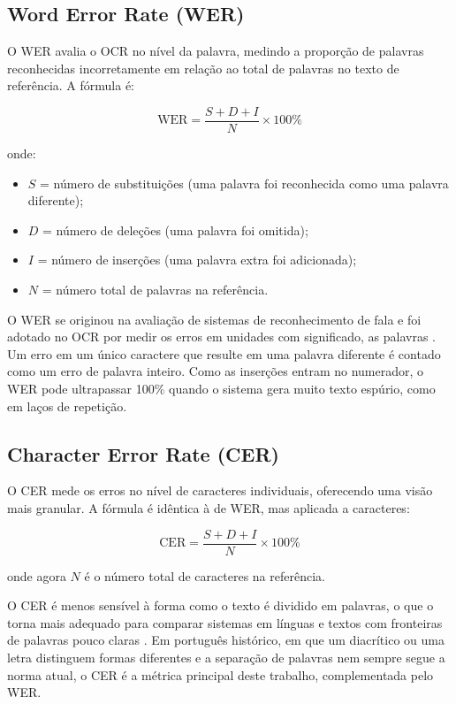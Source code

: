 \documentclass[noabntexcite,oneside]{ufsc-thesis-rn46-2019}
\begin{document}
\subsection{Word Error Rate (WER)}

O WER avalia o OCR no nível da palavra, medindo a
proporção de palavras reconhecidas incorretamente em relação ao total de palavras no
texto de referência. A fórmula é:

\[
\text{WER} = \frac{S + D + I}{N} \times 100\%
\]

onde:
\begin{itemize}
    \item $S$ = número de substituições (uma palavra foi reconhecida como uma palavra
    diferente);
    \item $D$ = número de deleções (uma palavra foi omitida);
    \item $I$ = número de inserções (uma palavra extra foi adicionada);
    \item $N$ = número total de palavras na referência.
\end{itemize}

O WER se originou na avaliação de sistemas de reconhecimento de fala
\cite{ScienceDirect2025} e foi adotado no OCR por medir os erros em unidades com
significado, as palavras \cite{neudecker2021}. Um erro em um único caractere que resulte
em uma palavra diferente é contado como um erro de palavra inteiro. Como as inserções
entram no numerador, o WER pode ultrapassar 100\% quando o sistema gera muito texto
espúrio, como em laços de repetição.

\subsection{Character Error Rate (CER)}

O CER mede os erros no nível de caracteres individuais, oferecendo uma visão mais
granular. A fórmula é idêntica à de WER, mas
aplicada a caracteres:

\[
\text{CER} = \frac{S + D + I}{N} \times 100\%
\]

onde agora $N$ é o número total de caracteres na referência.

O CER é menos sensível à forma como o texto é dividido em palavras, o que o torna mais
adequado para comparar sistemas em línguas e textos com fronteiras de palavras pouco
claras \cite{Advocating2025}. Em português histórico, em que um diacrítico ou uma letra
distinguem formas diferentes e a separação de palavras nem sempre segue a norma atual,
o CER é a métrica principal deste trabalho, complementada pelo WER.
\end{document}
